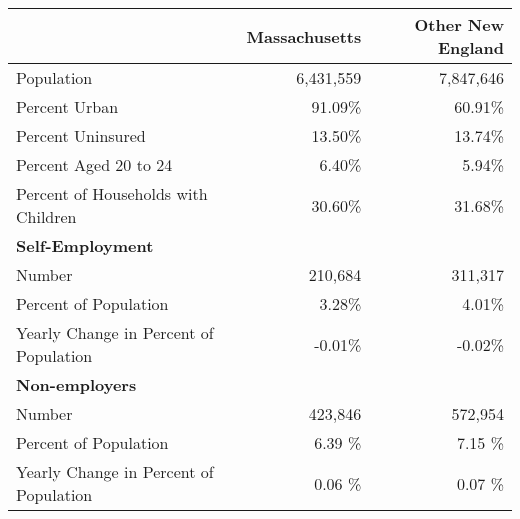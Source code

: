 \begin{tabular}{lrr} \hline \hline
& Massachusetts  & Other New England  \\  \hline
Population &   6,431,559 &    7,847,646 \\
Percent Urban &        91.09\% &        60.91\% \\
Percent Uninsured &        13.50\% &        13.74\% \\
Percent Aged 20 to 24 &         6.40\% &         5.94\% \\
Percent of Households with Children &        30.60\% &        31.68\% \\
\hline \textbf{Self-Employment} & & \\
Number &      210,684 &      311,317\\
Percent of Population &       3.28\% &       4.01\% \\
Yearly Change in Percent of Population &         -0.01\% &         -0.02\% \\
\hline \textbf{Non-employers} & & \\
Number &      423,846 &      572,954\\
Percent of Population &       6.39 \% &       7.15 \% \\
Yearly Change in Percent of Population &          0.06 \% &          0.07 \% \\
 \hline \hline \end{tabular}
